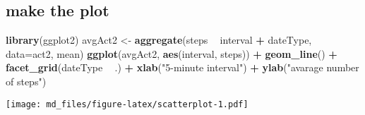 \documentclass[]{article}
\newenvironment{Shaded}{\begin{snugshade}}{\end{snugshade}}
\newcommand{\KeywordTok}[1]{\textcolor[rgb]{0.13,0.29,0.53}{\textbf{#1}}}
\newcommand{\DataTypeTok}[1]{\textcolor[rgb]{0.13,0.29,0.53}{#1}}
\newcommand{\DecValTok}[1]{\textcolor[rgb]{0.00,0.00,0.81}{#1}}
\newcommand{\StringTok}[1]{\textcolor[rgb]{0.31,0.60,0.02}{#1}}
\newcommand{\OperatorTok}[1]{\textcolor[rgb]{0.81,0.36,0.00}{\textbf{#1}}}
\newcommand{\NormalTok}[1]{#1}
\begin{document}
\begin{Shaded}
\end{Shaded}

\subsection{make the plot}\label{make-the-plot}

\begin{Shaded}
\begin{Highlighting}[]
\KeywordTok{library}\NormalTok{(ggplot2)}
\NormalTok{avgAct2 <-}\StringTok{ }\KeywordTok{aggregate}\NormalTok{(steps }\OperatorTok{~}\StringTok{ }\NormalTok{interval }\OperatorTok{+}\StringTok{ }\NormalTok{dateType, }\DataTypeTok{data=}\NormalTok{act2, mean)}
\KeywordTok{ggplot}\NormalTok{(avgAct2, }\KeywordTok{aes}\NormalTok{(interval, steps)) }\OperatorTok{+}\StringTok{ }
\StringTok{  }\KeywordTok{geom_line}\NormalTok{() }\OperatorTok{+}\StringTok{ }
\StringTok{  }\KeywordTok{facet_grid}\NormalTok{(dateType }\OperatorTok{~}\StringTok{ }\NormalTok{.) }\OperatorTok{+}
\StringTok{  }\KeywordTok{xlab}\NormalTok{(}\StringTok{"5-minute interval"}\NormalTok{) }\OperatorTok{+}\StringTok{ }
\StringTok{  }\KeywordTok{ylab}\NormalTok{(}\StringTok{"avarage number of steps"}\NormalTok{)}
\end{Highlighting}
\end{Shaded}

\texttt{[image: md\_files/figure-latex/scatterplot-1.pdf]}
\end{document}

